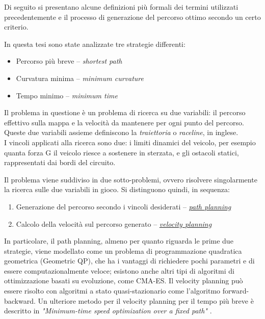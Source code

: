 Di seguito si presentano alcune definizioni più formali dei termini utilizzati precedentemente e il
processo di generazione del percorso ottimo secondo un certo criterio.

\bigskip
\noindent In questa tesi sono state analizzate tre strategie differenti:
\begin{itemize}
	\setlength\itemsep{0em}
	\item Percorso più breve  -- \textit{shortest path}
	\item Curvatura minima -- \textit{minimum curvature}
	\item Tempo minimo -- \textit{minimum time}
\end{itemize}

\noindent Il problema in questione è un problema di ricerca su due variabili: il percorso effettivo sulla mappa e
la velocità da mantenere per ogni punto del percorso. Queste due variabili assieme definiscono la
\textit{traiettoria} o \textit{raceline}, in inglese.\\
I vincoli applicati alla ricerca sono due: i limiti dinamici del veicolo, per esempio quanta forza G il
veicolo riesce a sostenere in sterzata, e gli ostacoli statici, rappresentati dai bordi del circuito.

\bigskip
\noindent Il problema viene suddiviso in due sotto-problemi, ovvero risolvere singolarmente la ricerca sulle due
variabili in gioco. Si distinguono quindi, in sequenza:
\begin{enumerate}
	\setlength\itemsep{0em}
	\item Generazione del percorso secondo i vincoli desiderati -- \hyperref[sec:path-models]{\textit{path
		planning}}
	\item Calcolo della velocità sul percorso generato -- \hyperref[sec:velocity-plan]{\textit{velocity
		planning}}
\end{enumerate}
In particolare, il path planning, almeno per quanto riguarda le prime due strategie, viene modellato come
un problema di programmazione quadratica geometrica (Geometric QP), che ha i vantaggi di richiedere pochi
parametri e di essere computazionalmente veloce; esistono anche altri tipi di algoritmi di ottimizzazione
basati su evoluzione, come CMA-ES. Il velocity planning può essere risolto con algoritmi a stato
quasi-stazionario come l'algoritmo forward-backward. Un ulteriore metodo per il velocity planning per il
tempo più breve è descritto in \textit{"Minimum-time speed optimization over a fixed path"}
\cite{lipp2014minimum}.


